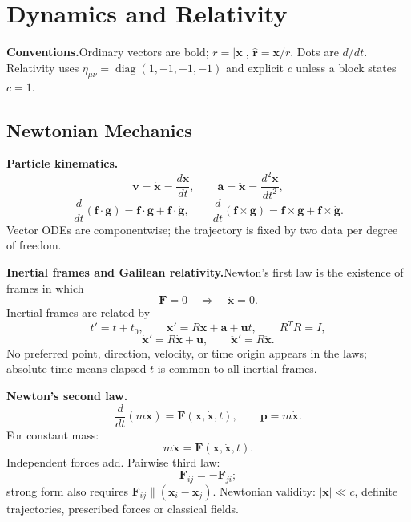 \providecommand{\half}{\frac{1}{2}}
\providecommand{\epszero}{\epsilon_0}
\providecommand{\rhat}{\hat{\mathbf r}}
\providecommand{\thetahat}{\hat{\boldsymbol\theta}}
\providecommand{\om}{\bm{\omega}}
\providecommand{\Iten}{\mathsf I}
\providecommand{\tr}{\operatorname{tr}}

\section{Dynamics and Relativity}
\label{sec:dynamics-relativity}

\noindent\textbf{Conventions.}\quad Ordinary vectors are bold; $r=|\mathbf x|$,
$\rhat=\mathbf x/r$. Dots are $d/dt$. Relativity uses
$\eta_{\mu\nu}=\operatorname{diag}(1,-1,-1,-1)$ and explicit $c$ unless a block
states $c=1$.

\subsection{Newtonian Mechanics}

\noindent\textbf{Particle kinematics.}\quad
\[
  \mathbf v=\dot{\mathbf x}=\frac{d\mathbf x}{dt},\qquad
  \mathbf a=\ddot{\mathbf x}=\frac{d^2\mathbf x}{dt^2},
\]
\[
  \frac{d}{dt}(\mathbf f\cdot\mathbf g)=\dot{\mathbf f}\cdot\mathbf g+
  \mathbf f\cdot\dot{\mathbf g},\qquad
  \frac{d}{dt}(\mathbf f\times\mathbf g)=\dot{\mathbf f}\times\mathbf g+
  \mathbf f\times\dot{\mathbf g}.
\]
Vector ODEs are componentwise; the trajectory is fixed by two data per degree of
freedom. 

\noindent\textbf{Inertial frames and Galilean relativity.}\quad Newton's first law is
the existence of frames in which
\[
  \boxed{\mathbf F=0\quad\Longrightarrow\quad \ddot{\mathbf x}=0}.
\]
Inertial frames are related by
\[
  t'=t+t_0,\qquad
  \mathbf x'=R\mathbf x+\mathbf a+\mathbf u t,\qquad R^TR=I,
\]
\[
  \dot{\mathbf x}'=R\dot{\mathbf x}+\mathbf u,\qquad
  \ddot{\mathbf x}'=R\ddot{\mathbf x}.
\]
No preferred point, direction, velocity, or time origin appears in the laws; absolute
time means elapsed $t$ is common to all inertial frames. 

\noindent\textbf{Newton's second law.}\quad
\[
  \boxed{\frac{d}{dt}(m\dot{\mathbf x})=\mathbf F(\mathbf x,\dot{\mathbf x},t)},
  \qquad \mathbf p=m\dot{\mathbf x}.
\]
For constant mass:
\[
  \boxed{m\ddot{\mathbf x}=\mathbf F(\mathbf x,\dot{\mathbf x},t)}.
\]
Independent forces add. Pairwise third law:
\[
  \mathbf F_{ij}=-\mathbf F_{ji};
\]
strong form also requires $\mathbf F_{ij}\parallel(\mathbf x_i-\mathbf x_j)$.
Newtonian validity: $|\dot{\mathbf x}|\ll c$, definite trajectories, prescribed
forces or classical fields. 

